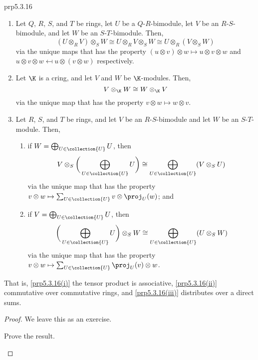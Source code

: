 \begin{prp}{}{prp5.3.16}
	\begin{enumerate}
		\item \label{prp5.3.16(i)}Let $Q$, $R$, $S$, and $T$ be rings, let $U$ be a $Q$-$R$-bimodule, let $V$ be an $R$-$S$-bimodule, and let $W$ be an $S$-$T$-bimodule.  Then,
		\begin{equation*}
		(U\otimes _RV)\otimes _SW\cong U\otimes _RV\otimes _SW\cong U\otimes _R(V\otimes _SW)
		\end{equation*}
		via the unique maps that has the property $(u\otimes v)\otimes w\mapsto u\otimes v\otimes w$ and $u\otimes v\otimes w\mapsfrom u\otimes (v\otimes w)$ respectively.
		\item \label{prp5.3.16(ii)}Let $\K$ is a cring, and let $V$ and $W$ be $\K$-modules.  Then,
		\begin{equation}
		V\otimes _{\K}W\cong W\otimes _{\K}V
		\end{equation}
		via the unique map that has the property $v\otimes w\mapsto w\otimes v$.
		\item \label{prp5.3.16(iii)}Let $R$, $S$, and $T$ be rings, and let $V$ be an $R$-$S$-bimodule and let $W$ be an $S$-$T$-module.  Then,
		\begin{enumerate}
			\item if $W=\bigoplus _{U\in \collection{U}}U$, then
			\begin{equation}
			V\otimes _S\bigg( \bigoplus _{U\in \collection{U}}U\bigg) \cong \bigoplus _{U\in \collection{U}}(V\otimes _SU)
			\end{equation}
			via the unique map that has the property $v\otimes w\mapsto \sum _{U\in \collection{U}}v\otimes \proj _U(w)$; and
			\item if $V=\bigoplus _{U\in \collection{U}}U$, then
			\begin{equation}
			\bigg( \bigoplus _{U\in \collection{U}}U\bigg) \otimes _SW\cong \bigoplus _{U\in \collection{U}}(U\otimes _SW)
			\end{equation}
			via the unique map that has the property $v\otimes w\mapsto \sum _{U\in \collection{U}}\proj _U(v)\otimes w$.
		\end{enumerate}
	\end{enumerate}
	\begin{rmk}
		That is, \cref{prp5.3.16(i)} the tensor product is associative, \cref{prp5.3.16(ii)} commutative over commutative rings, and \cref{prp5.3.16(iii)} distributes over a direct sums.
	\end{rmk}
	\begin{proof}
		We leave this as an exercise.
		\begin{exr}[breakable=false]{}{}
			Prove the result.
		\end{exr}
	\end{proof}
\end{prp}
